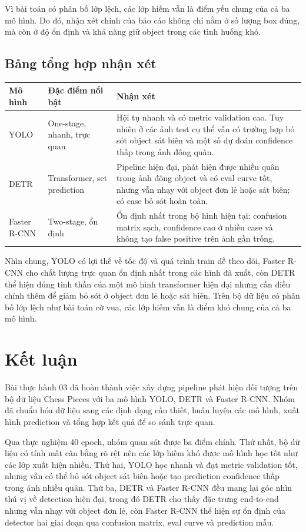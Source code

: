\documentclass[12pt,a4paper]{article}
\begin{document}
Vì bài toán có phân bố lớp lệch, các lớp hiếm vẫn là điểm yếu chung của cả ba mô hình. Do đó, nhận xét chính của báo cáo không chỉ nằm ở số lượng box đúng, mà còn ở độ ổn định và khả năng giữ object trong các tình huống khó.

\subsection{Bảng tổng hợp nhận xét}

\begin{longtable}{p{}p{}p{}}
\toprule
\textbf{Mô hình} & \textbf{Đặc điểm nổi bật} & \textbf{Nhận xét} \\
\midrule
YOLO & One-stage, nhanh, trực quan & Hội tụ nhanh và có metric validation cao. Tuy nhiên ở các ảnh test cụ thể vẫn có trường hợp bỏ sót object sát biên và một số dự đoán confidence thấp trong ảnh đông quân. \\
DETR & Transformer, set prediction & Pipeline hiện đại, phát hiện được nhiều quân trong ảnh đông object và có eval curve tốt, nhưng vẫn nhạy với object đơn lẻ hoặc sát biên; có case bỏ sót hoàn toàn. \\
Faster R-CNN & Two-stage, ổn định & Ổn định nhất trong bộ hình hiện tại: confusion matrix sạch, confidence cao ở nhiều case và không tạo false positive trên ảnh gần trống. \\
\bottomrule
\end{longtable}

Nhìn chung, YOLO có lợi thế về tốc độ và quá trình train dễ theo dõi, Faster R-CNN cho chất lượng trực quan ổn định nhất trong các hình đã xuất, còn DETR thể hiện đúng tinh thần của một mô hình transformer hiện đại nhưng cần điều chỉnh thêm để giảm bỏ sót ở object đơn lẻ hoặc sát biên. Trên bộ dữ liệu có phân bố lớp lệch như bài toán cờ vua, các lớp hiếm vẫn là điểm khó chung của cả ba mô hình.

\section{Kết luận}

Bài thực hành 03 đã hoàn thành việc xây dựng pipeline phát hiện đối tượng trên bộ dữ liệu Chess Pieces với ba mô hình YOLO, DETR và Faster R-CNN. Nhóm đã chuẩn hóa dữ liệu sang các định dạng cần thiết, huấn luyện các mô hình, xuất hình prediction và tổng hợp kết quả để so sánh trực quan.

Qua thực nghiệm 40 epoch, nhóm quan sát được ba điểm chính. Thứ nhất, bộ dữ liệu có tính mất cân bằng rõ rệt nên các lớp hiếm khó được mô hình học tốt như các lớp xuất hiện nhiều. Thứ hai, YOLO học nhanh và đạt metric validation tốt, nhưng vẫn có thể bỏ sót object sát biên hoặc tạo prediction confidence thấp trong ảnh nhiều quân. Thứ ba, DETR và Faster R-CNN đều mang lại góc nhìn thú vị về detection hiện đại, trong đó DETR cho thấy đặc trưng end-to-end nhưng vẫn nhạy với object đơn lẻ, còn Faster R-CNN thể hiện sự ổn định của detector hai giai đoạn qua confusion matrix, eval curve và prediction mẫu.
\end{document}
